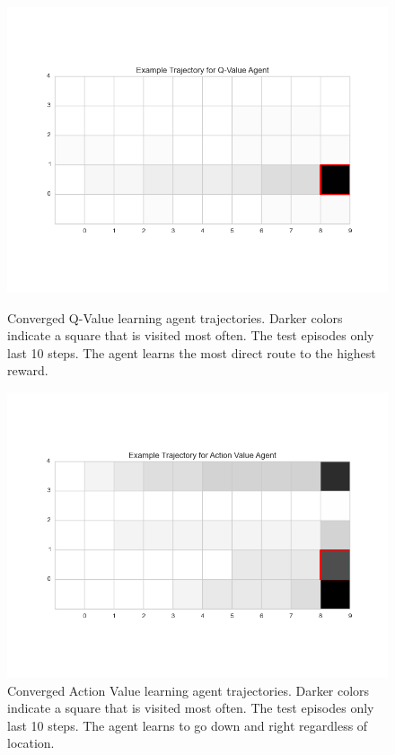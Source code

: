 \begin{figure}[h]
\centering
\begin{minipage}{0.45\textwidth}
\centering
\includegraphics[width=0.98\linewidth]{GridWorldQTraj.png}
\caption{Converged Q-Value learning agent trajectories.  Darker colors indicate a square that is visited most often.  The test episodes only last 10 steps.  The agent learns the most direct route to the highest reward.}
\label{fig:GridQTraj}
\end{minipage}%
%
\hspace{0.08\textwidth}%
\begin{minipage}{0.45\textwidth}
\includegraphics[width=\linewidth]{GridWorldAVTraj.png}
\caption{Converged Action Value learning agent trajectories.  Darker colors indicate a square that is visited most often.  The test episodes only last 10 steps.  The agent learns to go down and right regardless of location.}
\label{fig:GridAVTraj}
\end{minipage}
\end{figure}